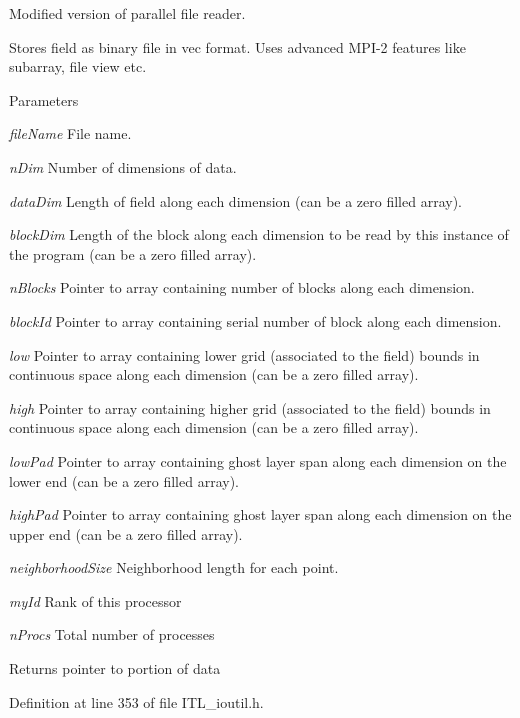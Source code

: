 Modified version of parallel file reader. 

Stores field as binary file in vec format. Uses advanced MPI-\/2 features like subarray, file view etc. 
\begin{DoxyParams}{Parameters}
\item[{\em fileName}]File name. \item[{\em nDim}]Number of dimensions of data. \item[{\em dataDim}]Length of field along each dimension (can be a zero filled array). \item[{\em blockDim}]Length of the block along each dimension to be read by this instance of the program (can be a zero filled array). \item[{\em nBlocks}]Pointer to array containing number of blocks along each dimension. \item[{\em blockId}]Pointer to array containing serial number of block along each dimension. \item[{\em low}]Pointer to array containing lower grid (associated to the field) bounds in continuous space along each dimension (can be a zero filled array). \item[{\em high}]Pointer to array containing higher grid (associated to the field) bounds in continuous space along each dimension (can be a zero filled array). \item[{\em lowPad}]Pointer to array containing ghost layer span along each dimension on the lower end (can be a zero filled array). \item[{\em highPad}]Pointer to array containing ghost layer span along each dimension on the upper end (can be a zero filled array). \item[{\em neighborhoodSize}]Neighborhood length for each point. \item[{\em myId}]Rank of this processor \item[{\em nProcs}]Total number of processes \end{DoxyParams}
\begin{DoxyReturn}{Returns}
pointer to portion of data 
\end{DoxyReturn}


Definition at line 353 of file ITL\_\-ioutil.h.

